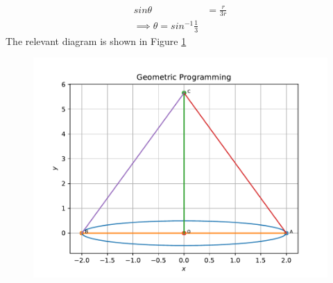 \documentclass[12pt]{article}
\begin{document}
\begin{enumerate}
\begin{align}
	sin\theta &= \frac{r}{3r} \\
	\implies \theta = sin^{-1}\frac{1}{3}
\end{align}
The relevant diagram is shown in Figure \ref{fig:Fig1}
\begin{figure}[!h]
	\begin{center}
		\includegraphics[width=\columnwidth]{figs/problem26.pdf}
	\end{center}
\caption{}
\label{fig:Fig1}
\end{figure}
\end{enumerate}
\end{document}

